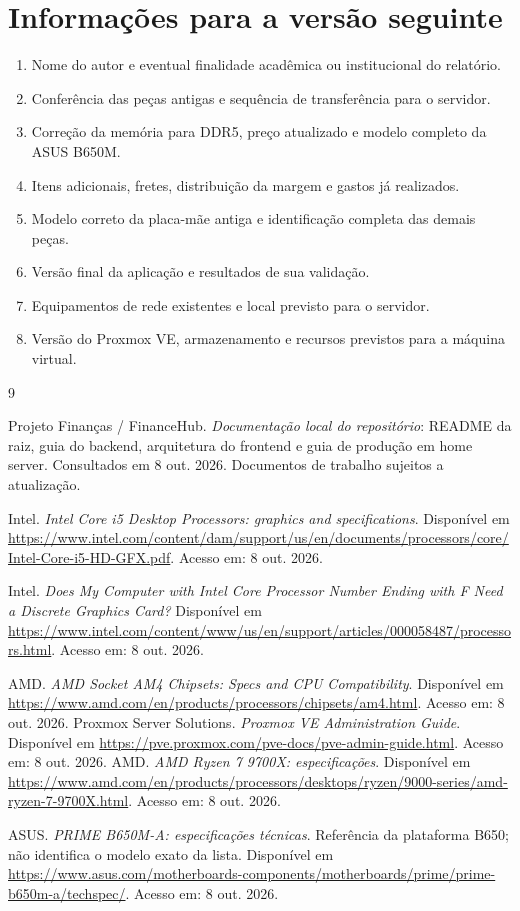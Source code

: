 \documentclass[11pt,a4paper,oneside]{report}
\begin{document}
\section{Informações para a versão seguinte}
\begin{enumerate}
\item Nome do autor e eventual finalidade acadêmica ou institucional do relatório.
\item Conferência das peças antigas e sequência de transferência para o servidor.
\item Correção da memória para DDR5, preço atualizado e modelo completo da ASUS B650M.
\item Itens adicionais, fretes, distribuição da margem e gastos já realizados.
\item Modelo correto da placa-mãe antiga e identificação completa das demais peças.
\item Versão final da aplicação e resultados de sua validação.
\item Equipamentos de rede existentes e local previsto para o servidor.
\item Versão do Proxmox VE, armazenamento e recursos previstos para a máquina virtual.
\end{enumerate}

\begin{thebibliography}{9}
 Projeto Finanças / FinanceHub.
\textit{Documentação local do repositório}: README da raiz, guia do backend,
arquitetura do frontend e guia de produção em home server.
Consultados em 8 out. 2026. Documentos de trabalho sujeitos a atualização.

 Intel.
\textit{Intel Core i5 Desktop Processors: graphics and specifications}.
Disponível em
\url{https://www.intel.com/content/dam/support/us/en/documents/processors/core/Intel-Core-i5-HD-GFX.pdf}.
Acesso em: 8 out. 2026.

 Intel.
\textit{Does My Computer with Intel Core Processor Number Ending with F Need a Discrete Graphics Card?}
Disponível em
\url{https://www.intel.com/content/www/us/en/support/articles/000058487/processors.html}.
Acesso em: 8 out. 2026.

 AMD.
\textit{AMD Socket AM4 Chipsets: Specs and CPU Compatibility}.
Disponível em \url{https://www.amd.com/en/products/processors/chipsets/am4.html}.
Acesso em: 8 out. 2026.
 Proxmox Server Solutions.
\textit{Proxmox VE Administration Guide}.
Disponível em \url{https://pve.proxmox.com/pve-docs/pve-admin-guide.html}.
Acesso em: 8 out. 2026.
 AMD.
\textit{AMD Ryzen 7 9700X: especificações}.
Disponível em
\url{https://www.amd.com/en/products/processors/desktops/ryzen/9000-series/amd-ryzen-7-9700X.html}.
Acesso em: 8 out. 2026.

 ASUS.
\textit{PRIME B650M-A: especificações técnicas}.
Referência da plataforma B650; não identifica o modelo exato da lista.
Disponível em
\url{https://www.asus.com/motherboards-components/motherboards/prime/prime-b650m-a/techspec/}.
Acesso em: 8 out. 2026.
\end{thebibliography}
\end{document}
